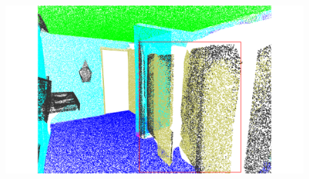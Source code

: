 \begin{figure}[htbp]
\begin{minipage}{0.22\textwidth}
    \end{minipage}
    \hfill
    \begin{minipage}{0.22\textwidth}
        \centering
        \includegraphics[width=\textwidth]{fig/supplement/semantic_segmentation/wc_2/PPT_wc_2.pdf}
    \end{minipage}
    \hfill

    \vspace{0.5em}


\end{figure}
